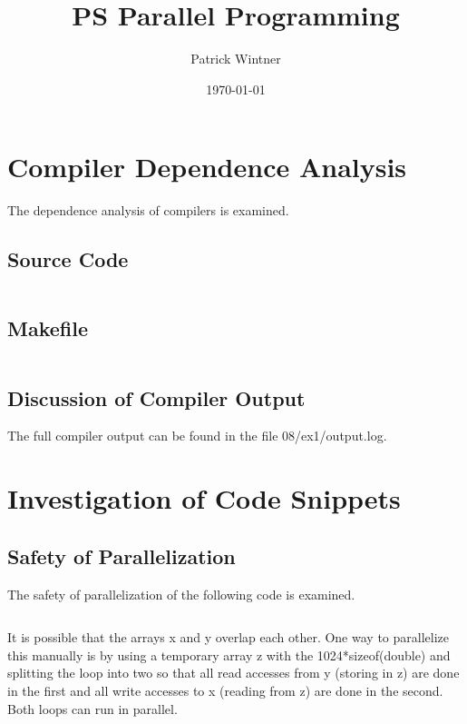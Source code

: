 \documentclass[parskip]{scrartcl}
\title{PS Parallel Programming}
\author{Patrick Wintner}
\date{\today}
\begin{document}
	\maketitle
	
	\section{Compiler Dependence Analysis}
	The dependence analysis of compilers is examined.
	\subsection{Source Code}
	\inputminted	[linenos]{c}{ex1/analysis.c}
	
	\subsection{Makefile}
	\inputminted{make}{ex1/Makefile}
	
	\subsection{Discussion of Compiler Output}
	The full compiler output can be found in the file 08/ex1/output.log.
	
	
	\section{Investigation of Code Snippets}
	\subsection{Safety of Parallelization}
	The safety of parallelization of the following code is examined.
	
	\inputminted	[linenos]{c}{ex2/01.c}
	
	It is possible that the arrays x and y overlap each other. One way to parallelize this manually is by using a temporary array z with the 1024*sizeof(double) and splitting the loop into two so that all read accesses from y (storing in z) are done in the first and all write accesses to x (reading from z) are done in the second. Both loops can run in parallel.
	
\end{document}
